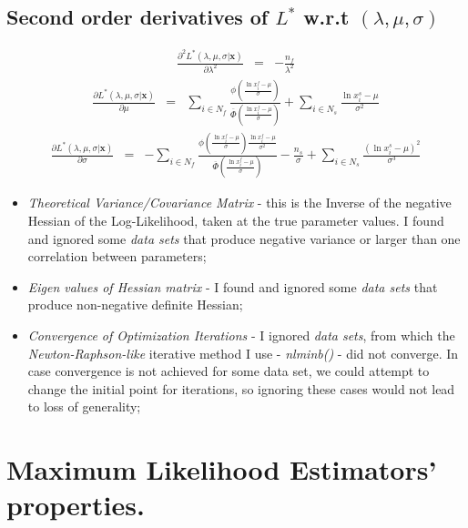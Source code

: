 \documentclass{article}
\begin{document}
\subsection{Second order derivatives of $L^*$ w.r.t $\left(\lambda, \mu, \sigma \right)$}
\begin{eqnarray}
\frac{\partial^2 L^*(\lambda, \mu, \sigma | \textbf{x}) }{\partial \lambda^2} &=& - \frac{n_f}{\lambda ^ 2} 
\end{eqnarray} 
\begin{eqnarray}
\frac{\partial L^*(\lambda, \mu, \sigma | \textbf{x}) }{\partial \mu} &=& \sum_{i \in N_f} \frac{\phi \left( \frac{\ln x_i^f - \mu}{\sigma} \right)}{\overline \Phi \left( \frac{\ln x_i^f - \mu}{\sigma} \right)} + \sum_{i \in N_s} \frac{\ln x_i^s - \mu}{\sigma ^ 2} 
\end{eqnarray} 
\begin{eqnarray}
\frac{\partial L^*(\lambda, \mu, \sigma | \textbf{x}) }{\partial \sigma} &=& - \sum_{i \in N_f} \frac{\phi \left( \frac{\ln x_i^f - \mu}{\sigma} \right) \frac{\ln x_i^f - \mu}{\sigma ^ 2}}{\overline \Phi \left( \frac{\ln x_i^f - \mu}{\sigma} \right)} - \frac{n_s}{\sigma} + \sum_{i \in N_s} \frac{\left(\ln x_i^s - \mu\right)^2}{\sigma ^ 3} 
\end{eqnarray} 
\begin{itemize}
\item \textit{Theoretical Variance/Covariance Matrix} - this is the Inverse of the negative Hessian of the Log-Likelihood, taken at the true parameter values. I found and ignored some \textit{data sets} that produce negative variance or larger than one correlation between parameters;
\item \textit{Eigen values of Hessian matrix} - I found and ignored some \textit{data sets} that produce non-negative definite Hessian;
\item \textit{Convergence of Optimization Iterations} - I ignored \textit{data sets}, from which the \textit{Newton-Raphson-like} iterative method I use - \textit{nlminb()} - did not converge. In case convergence is not achieved for some data set, we could attempt to change the initial point for iterations, so ignoring these cases would not lead to loss of generality;
\end{itemize}
\section{Maximum Likelihood Estimators' properties.}
\end{document}

